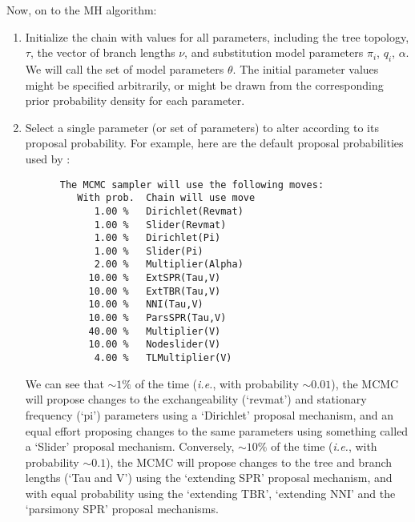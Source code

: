 Now, on to the MH algorithm:

\begin{enumerate}
\item{Initialize the chain with values for all parameters, including the tree topology, $\tau$, the vector of branch lengths $\nu$, and substitution model parameters $\pi_i$, $q_i$, $\alpha$. 
We will call the set of model parameters $\theta$. The initial parameter values might be specified arbitrarily, or might be drawn from the corresponding prior probability density for each parameter.}

\item{Select a single parameter (or set of parameters) to alter according to its proposal probability. 
For example, here are the default proposal probabilities used by \MrBayes:
{\tt \scriptsize \begin{framed}
\begin{lstlisting}
      The MCMC sampler will use the following moves:
         With prob.  Chain will use move
            1.00 %   Dirichlet(Revmat)
            1.00 %   Slider(Revmat)
            1.00 %   Dirichlet(Pi)
            1.00 %   Slider(Pi)
            2.00 %   Multiplier(Alpha)
           10.00 %   ExtSPR(Tau,V)
           10.00 %   ExtTBR(Tau,V)
           10.00 %   NNI(Tau,V)
           10.00 %   ParsSPR(Tau,V)
           40.00 %   Multiplier(V)
           10.00 %   Nodeslider(V)
            4.00 %   TLMultiplier(V)
\end{lstlisting}
\end{framed}}

We can see that $\sim 1\%$ of the time ({\it i.e.}, with probability $\sim 0.01$), the MCMC will propose changes to the exchangeability (`revmat') and stationary frequency (`pi') parameters using a `Dirichlet' proposal mechanism, and an equal effort proposing changes to the same parameters using something called a `Slider' proposal mechanism.
Conversely, $\sim 10\%$ of the time ({\it i.e.}, with probability $\sim 0.1$), the MCMC will propose changes to the tree and branch lengths (`Tau and V') using the `extending SPR' proposal mechanism, and with equal probability using the `extending TBR', `extending NNI' and the `parsimony SPR' proposal mechanisms.

}
\end{enumerate}
